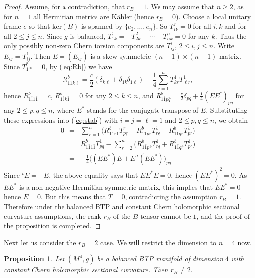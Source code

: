 \documentclass{amsart}
\newtheorem{proposition}{Proposition}
\begin{document}
\begin{proof}
Assume, for a contradiction, that $r_B=1$. We may assume that $n\geq 2$, as for $n=1$ all Hermitian metrics are K\"ahler (hence $r_B=0$). Choose a local unitary frame $e$ so that $\mbox{ker}(B)$ is spanned by $\{ e_2, \ldots, e_n\}$. So $T^j_{ik}=0$ for all $i,k$ and for all $2\leq j\leq n$. Since $g$ is balanced, $T^1_{1k}=-T^2_{2k}-\cdots-T^n_{nk}=0$ for any $k$. Thus the only possibly non-zero Chern torsion components are $T^1_{ij}$, $2\leq i, j\leq n$. Write $E_{ij}=T^1_{ij}$. Then $E=(E_{ij})$ is a skew-symmetric $(n-1)\times (n-1)$ matrix. Since $T^{\ast}_{1\ast}=0$, by (\ref{eq:Rb}) we have
$$ R^b_{1\bar{1}k\bar{\ell}} = \frac{c}{2}(\delta_{k\ell} + \delta_{1k} \delta_{1\ell }) + \frac{1}{4}\sum_{r=1}^n T^1_{kr} \overline{T^1_{\ell r}} ,$$
hence $R^b_{1\bar{1}1\bar{1}}=c$, $R^b_{1\bar{1}k\bar{1}}=0$ for any $2\leq k\leq n$, and $R^b_{1\bar{1}p\bar{q}}= \frac{c}{2}\delta_{pq} + \frac{1}{4} (E E^{\ast})_{pq}$ for any $2\leq p,q\leq n$, where $E^{\ast}$ stands for the conjugate transpose of $E$. Substituting these expressions into (\ref{eq:stab}) with $i=j=\ell=1$ and $2\leq p,q\leq n$, we obtain
\begin{eqnarray*}
0 & = &  \sum_{r=1}^n \big( R^b_{1\bar{1}r\bar{1}}T^r_{pq} - R^b_{1\bar{1}p\bar{r}} T^1_{rq} -  R^b_{1\bar{1}q\bar{r}} T^1_{pr} \big) \\
& = & R^b_{1\bar{1}1\bar{1}}T^1_{pq} - \sum_{r=2}^n \big( R^b_{1\bar{1}p\bar{r}} T^1_{rq} + R^b_{1\bar{1}q\bar{r}} T^1_{pr} \big)\\
& = & -\frac{1}{4}\big( (EE^{\ast})E + E\,^t\!(EE^{\ast}) \big)_{pq}
\end{eqnarray*}
Since $^t\!E=-E$, the above equality says that $EE^{\ast}E=0$, hence $(EE^{\ast})^2=0$. As $EE^{\ast}$ is a non-negative Hermitian symmetric matrix, this implies that $EE^{\ast}=0$ hence $E=0$. But this means that $T=0$, contradicting the assumption $r_B=1$. Therefore under the balanced BTP and constant Chern holomorphic sectional curvature assumptions, the rank $r_B$ of the $B$ tensor cannot be $1$, and the proof of the proposition is completed.
\end{proof}

Next let us consider the $r_B=2$ case. We will restrict the dimension to $n=4$ now.

\begin{proposition} \label{proprank2}
Let $(M^4,g)$ be a balanced BTP manifold of dimension $4$ with constant Chern holomorphic sectional curvature. Then $r_B\neq 2$.
\end{proposition}
\end{document}
